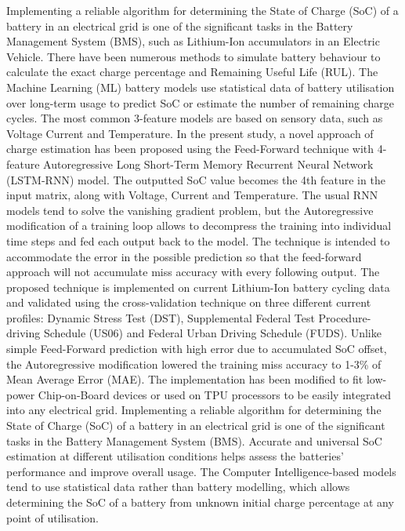 %
 {
Implementing a reliable algorithm for determining the State of Charge (SoC) of a battery in an electrical grid is one of the significant tasks in the Battery Management System (BMS), such as Lithium-Ion accumulators in an Electric Vehicle.
There have been numerous methods to simulate battery behaviour to calculate the exact charge percentage and Remaining Useful Life (RUL).
The Machine Learning (ML) battery models use statistical data of battery utilisation over long-term usage to predict SoC or estimate the number of remaining charge cycles.
The most common 3-feature models are based on sensory data, such as Voltage Current and Temperature.
In the present study, a novel approach of charge estimation has been proposed using the Feed-Forward technique with 4-feature Autoregressive Long Short-Term Memory Recurrent Neural Network (LSTM-RNN) model.
The outputted SoC value becomes the 4th feature in the input matrix, along with Voltage, Current and Temperature.
The usual RNN models tend to solve the vanishing gradient problem, but the Autoregressive modification of a training loop allows to decompress the training into individual time steps and fed each output back to the model.
The technique is intended to accommodate the error in the possible prediction so that the feed-forward approach will not accumulate miss accuracy with every following output.
The proposed technique is implemented on current Lithium-Ion battery cycling data and validated using the cross-validation technique on three different current profiles: Dynamic Stress Test (DST), Supplemental Federal Test Procedure-driving Schedule (US06) and Federal Urban Driving Schedule (FUDS).
Unlike simple Feed-Forward prediction with high error due to accumulated  SoC offset, the Autoregressive modification lowered the training miss accuracy to 1-3\% of Mean Average Error (MAE).
The implementation has been modified to fit low-power Chip-on-Board devices or used on TPU processors to be easily integrated into any electrical grid.
}{
    Implementing a reliable algorithm for determining the State of Charge (SoC) of a battery in an electrical grid is one of the significant tasks in the Battery Management System (BMS).
    Accurate and universal SoC estimation at different utilisation conditions helps assess the batteries' performance and improve overall usage.
    The Computer Intelligence-based models tend to use statistical data rather than battery modelling, which allows determining the SoC of a battery from unknown initial charge percentage at any point of utilisation.
}
